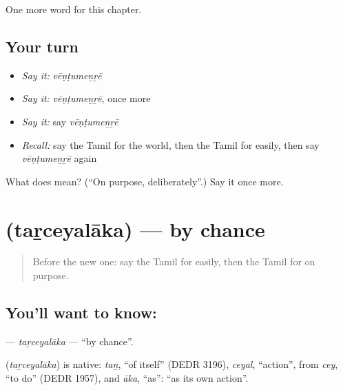 \begin{grammarlens}[title={What you've built}]
One more word for this chapter.
\end{grammarlens}

\subsection*{Your turn}
\begin{itemize}
\raggedright
  \item \emph{Say it:} \emph{vēṇṭumeṉṟē}
  \item \emph{Say it:} \emph{vēṇṭumeṉṟē}, once more
  \item \emph{Say it:} say \emph{vēṇṭumeṉṟē}
  \item \emph{Recall:} say the Tamil for the world, then the Tamil for easily, then say \emph{vēṇṭumeṉṟē} again
\end{itemize}

\begin{tcolorbox}[breakable,colback=teal!4,colframe=teal!35!black,title={Before you move on}]
What does  mean? (\textquotedblleft{}On purpose, deliberately\textquotedblright{}.) Say it once more.
\end{tcolorbox}
\section[\texorpdfstring{\ta{தற்செயலாக} (taṟceyalāka)}{தற்செயலாக (taṟceyalāka)}]{ (taṟceyalāka) — by chance}

\label{lesson:TA-C266-tarceyalaka}



\begin{quote}
Before the new one: say the Tamil for easily, then the Tamil for on purpose.
\end{quote}

\subsection*{You'll want to know: }
\textbf{} — \emph{taṟceyalāka} — \textquotedblleft{}by chance\textquotedblright{}.

\begin{cousinweb}
\textbf{} (\emph{taṟceyalāka}) is native: \emph{taṉ}, \textquotedblleft{}of itself\textquotedblright{} (DEDR 3196), \emph{ceyal}, \textquotedblleft{}action\textquotedblright{}, from \emph{cey}, \textquotedblleft{}to do\textquotedblright{} (DEDR 1957), and \emph{āka}, \textquotedblleft{}as\textquotedblright{}: \textquotedblleft{}as its own action\textquotedblright{}.
\end{cousinweb}

